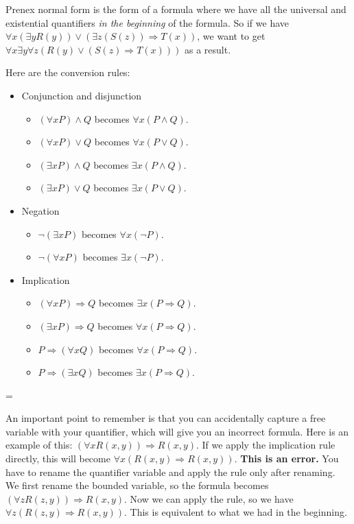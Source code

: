 \documentclass[10pt]{article}
\newenvironment{warning}
  {\par\begin{mdframed}[linewidth=1pt,linecolor=black]%
    \begin{list}{}{\leftmargin=1cm
                   \labelwidth=\leftmargin}\item[\Large\ding{43}]}
  {\end{list}\end{mdframed}\par}
\newcommand{\imp}{\ensuremath{\Rightarrow}}
\begin{document}
Prenex normal form is the form of a formula where we have all the universal and existential quantifiers \emph{in the beginning} of the formula. So if we have $\forall x (\exists y R(y)) \lor (\exists z (S(z)) \imp T(x))$, we want to get $\forall x \exists y \forall z (R(y) \lor (S(z) \imp T(x)))$ as a result.

Here are the conversion rules:
\begin{itemize}
\setlength\itemsep{0.1em}
\item Conjunction and disjunction
\begin{itemize}
\setlength\itemsep{0.1em}
    \item $(\forall x P) \land Q$ becomes $\forall x (P \land Q)$.
    \item $(\forall x P) \lor Q$ becomes $\forall x (P \lor Q)$.
    \item $(\exists x P) \land Q$ becomes $\exists x (P \land Q)$.
    \item $(\exists x P) \lor Q$ becomes $\exists x (P \lor Q)$.
\end{itemize}

\item Negation
\begin{itemize}
\setlength\itemsep{0.1em}
    \item $\lnot (\exists x P)$ becomes $\forall x (\lnot P)$.
    \item $\lnot (\forall x P)$ becomes $\exists x (\lnot P)$.
\end{itemize}
\newpage
\item Implication
\begin{itemize}
\setlength\itemsep{0.1em}
    \item $(\forall x P) \imp Q$ becomes $\exists x (P \imp Q)$.
    \item $(\exists x P) \imp Q$ becomes $\forall x (P \imp Q)$.
    \item $P \imp (\forall x Q)$ becomes $\forall x (P \imp Q)$.
    \item $P \imp (\exists x Q)$ becomes $\exists x (P \imp Q)$.
\end{itemize}
\end{itemize}

\begin{warning}
An important point to remember is that you can accidentally capture a free variable with your quantifier, which will give you an incorrect formula. Here is an example of this: $(\forall x R(x,y)) \imp R(x,y)$. If we apply the implication rule directly, this will become $\forall x (R(x,y) \imp R(x,y))$. \textbf{This is an error.} You have to rename the quantifier variable and apply the rule only after renaming. We first rename the bounded variable, so the formula becomes $(\forall z R(z,y)) \imp R(x,y)$. Now we can apply the rule, so we have $\forall z (R(z,y) \imp R(x,y))$. This is equivalent to what we had in the beginning.
\end{warning}
\end{document}
